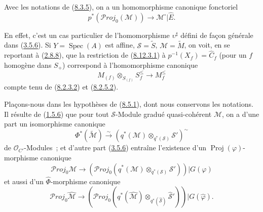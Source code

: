 \begin{env}[8.12.3]
\label{II.8.12.3-fr}
Avec les notations de (\hyperref[II.8.3.5-fr]{8.3.5}), on a un
homomorphisme canonique fonctoriel
\begin{equation}
\label{II.8.12.3.1-fr}
  p^*(\mathcal{P}\mathit{roj}_0(\mathcal{M}))
  \to\mathcal{M}^{\square}|\widehat{E}.
\tag{8.12.3.1}
\end{equation}

En effet, c'est un cas particulier de l'homomorphisme $\upsilon^{\sharp}$ défini de
façon générale dans (\hyperref[II.3.5.6-fr]{3.5.6}). Si
$Y=\operatorname{Spec}(A)$ est affine, $\mathcal{S}=\widetilde{S}$,
$\mathcal{M}=\widetilde{M}$, on voit, en se reportant à
(\hyperref[II.2.8.8-fr]{2.8.8}), que la restriction de
(\hyperref[II.8.12.3.1-fr]{8.12.3.1}) à
$p^{-1}(X_f)=\widehat{C}_f$ (pour un $f$ homogène dans $S_+$) correspond à
l'homomorphisme canonique
\begin{equation}
\label{II.8.12.3.2-fr}
  M_{(f)}\otimes_{S_{(f)}}S_f^{\leq}\to M_f^{\leq}
\tag{8.12.3.2}
\end{equation}
compte tenu de (\hyperref[II.8.2.3.2-fr]{8.2.3.2}) et
(\hyperref[II.8.2.5.2-fr]{8.2.5.2}).
\end{env}

\begin{env}[8.12.4]
\label{II.8.12.4-fr}
Plaçons-nous dans les hypothèses de (\hyperref[II.8.5.1-fr]{8.5.1}), dont
nous conservons les notations. Il résulte de
(\hyperref[II.1.5.6-fr]{1.5.6}) que pour tout $\mathcal{S}$-Module gradué
quasi-cohérent $\mathcal{M}$, on a d'une part un isomorphisme canonique
\begin{equation}
\label{II.8.12.4.1-fr}
  \Phi^*(\widetilde{\mathcal{M}})
  \xrightarrow{\sim}
  \left(q^*(\mathcal{M})\otimes_{q^*(\mathcal{S})}\mathcal{S}'\right)^{\sim}
\tag{8.12.4.1}
\end{equation}
de $\mathcal{O}_{C'}$-Modules~; et d'autre part
(\hyperref[II.3.5.6-fr]{3.5.6}) entraîne l'existence d'un
$\operatorname{Proj}(\varphi)$-morphisme canonique
\begin{equation}
\label{II.8.12.4.2-fr}
  \mathcal{P}\mathit{roj}_0\mathcal{M}\to
  \left(\mathcal{P}\mathit{roj}_0
  (q^*(\mathcal{M})\otimes_{q^*(\mathcal{S})}\mathcal{S}')\right)
  |G(\varphi)
\tag{8.12.4.2}
\end{equation}
et aussi d'un $\widehat{\Phi}$-morphisme canonique
\begin{equation}
\label{II.8.12.4.3-fr}
  \mathcal{P}\mathit{roj}_0\widehat{\mathcal{M}}\to
  \left(\mathcal{P}\mathit{roj}_0
  (q^*(\widehat{\mathcal{M}})
  \otimes_{q^*(\widehat{\mathcal{S}})}\widehat{\mathcal{S}}')\right)
  |G(\widehat{\varphi}).
\tag{8.12.4.3}
\end{equation}
\end{env}

